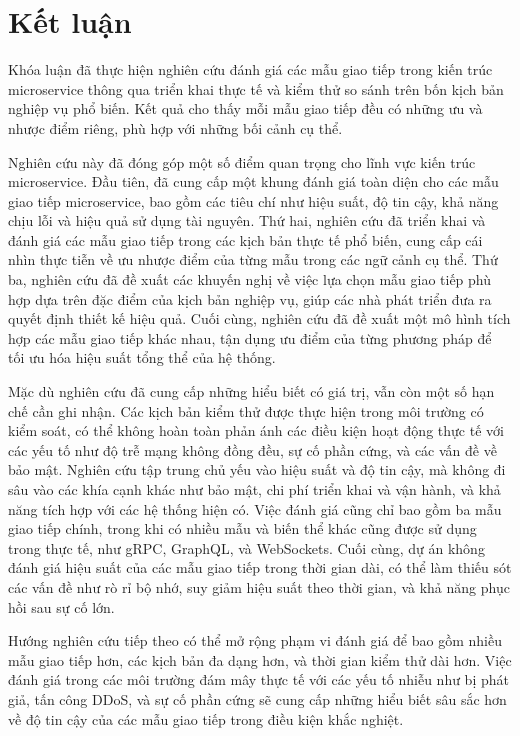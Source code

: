 \chapter{Kết luận}

Khóa luận đã thực hiện nghiên cứu đánh giá các mẫu giao tiếp trong kiến trúc microservice thông qua triển khai thực tế và kiểm thử so sánh trên bốn kịch bản nghiệp vụ phổ biến. Kết quả cho thấy mỗi mẫu giao tiếp đều có những ưu và nhược điểm riêng, phù hợp với những bối cảnh cụ thể.

Nghiên cứu này đã đóng góp một số điểm quan trọng cho lĩnh vực kiến trúc microservice. Đầu tiên, đã cung cấp một khung đánh giá toàn diện cho các mẫu giao tiếp microservice, bao gồm các tiêu chí như hiệu suất, độ tin cậy, khả năng chịu lỗi và hiệu quả sử dụng tài nguyên. Thứ hai, nghiên cứu đã triển khai và đánh giá các mẫu giao tiếp trong các kịch bản thực tế phổ biến, cung cấp cái nhìn thực tiễn về ưu nhược điểm của từng mẫu trong các ngữ cảnh cụ thể. Thứ ba, nghiên cứu đã đề xuất các khuyến nghị về việc lựa chọn mẫu giao tiếp phù hợp dựa trên đặc điểm của kịch bản nghiệp vụ, giúp các nhà phát triển đưa ra quyết định thiết kế hiệu quả. Cuối cùng, nghiên cứu đã đề xuất một mô hình tích hợp các mẫu giao tiếp khác nhau, tận dụng ưu điểm của từng phương pháp để tối ưu hóa hiệu suất tổng thể của hệ thống.

Mặc dù nghiên cứu đã cung cấp những hiểu biết có giá trị, vẫn còn một số hạn chế cần ghi nhận. Các kịch bản kiểm thử được thực hiện trong môi trường có kiểm soát, có thể không hoàn toàn phản ánh các điều kiện hoạt động thực tế với các yếu tố như độ trễ mạng không đồng đều, sự cố phần cứng, và các vấn đề về bảo mật. Nghiên cứu tập trung chủ yếu vào hiệu suất và độ tin cậy, mà không đi sâu vào các khía cạnh khác như bảo mật, chi phí triển khai và vận hành, và khả năng tích hợp với các hệ thống hiện có. Việc đánh giá cũng chỉ bao gồm ba mẫu giao tiếp chính, trong khi có nhiều mẫu và biến thể khác cũng được sử dụng trong thực tế, như gRPC, GraphQL, và WebSockets. Cuối cùng, dự án không đánh giá hiệu suất của các mẫu giao tiếp trong thời gian dài, có thể làm thiếu sót các vấn đề như rò rỉ bộ nhớ, suy giảm hiệu suất theo thời gian, và khả năng phục hồi sau sự cố lớn.

Hướng nghiên cứu tiếp theo có thể mở rộng phạm vi đánh giá để bao gồm nhiều mẫu giao tiếp hơn, các kịch bản đa dạng hơn, và thời gian kiểm thử dài hơn. Việc đánh giá trong các môi trường đám mây thực tế với các yếu tố nhiễu như bị phát giả, tấn công DDoS, và sự cố phần cứng sẽ cung cấp những hiểu biết sâu sắc hơn về độ tin cậy của các mẫu giao tiếp trong điều kiện khắc nghiệt.

